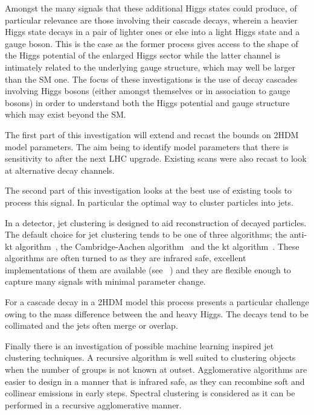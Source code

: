 Amongst the many signals that these additional Higgs states could produce,
of particular relevance are those involving their cascade decays,
wherein a heavier Higgs state decays in a pair of lighter ones or else into a light Higgs state and a gauge boson.
This is the case as the former process gives access to the shape of the Higgs potential of the enlarged Higgs sector
while the latter channel is intimately related to the underlying gauge structure, which may well be larger than the SM one. 
The focus of these investigations is the use of decay cascades involving Higgs bosons (either amongst themselves or in association to gauge bosons) in order to understand both the Higgs potential and gauge structure which may exist beyond the SM.

The first part of this investigation will extend and recast the bounds on
2HDM model parameters.
The aim being to identify model parameters that there is sensitivity to after the next LHC upgrade.
Existing scans were also recast to look at alternative decay channels.

The second part of this investigation looks at the best use of existing tools
to process this signal.
In particular the optimal way to cluster particles into jets.

In a detector, jet clustering is designed to aid reconstruction of decayed particles.
The default choice for jet clustering tends to be one of three algorithms;
the anti-kt algorithm~\cite{Cacciari2008akt}, the Cambridge-Aachen algorithm~\cite{Wobisch1998caJet} and the kt algorithm~\cite{Ellis1993ktJet}.
These algorithms are often turned to as they are infrared safe, excellent implementations of them are available (see \fastjet{}~\cite{Cacciari2011FastJet})
and they are flexible enough to capture many signals with minimal parameter change.

For a cascade decay in a 2HDM model this process presents a particular challenge owing to the
mass difference between the  and heavy Higgs.
The decays tend to be collimated and the jets often merge or overlap.

Finally there is an investigation of possible machine learning inspired jet clustering techniques.
A recursive algorithm is well suited to clustering objects when the number of groups is not known at outset.
Agglomerative algorithms are easier to design in a manner that is infrared safe,
as they can recombine soft and collinear emissions in early steps.
Spectral clustering is considered as it can be performed in a recursive agglomerative manner.


